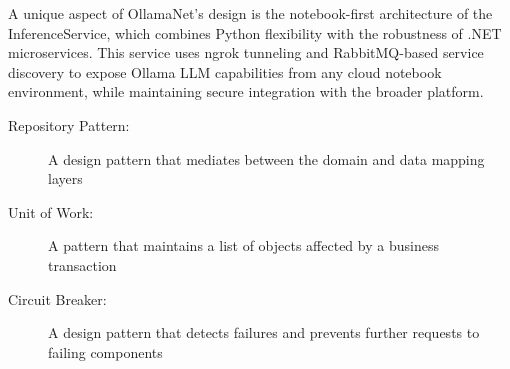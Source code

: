 A unique aspect of OllamaNet's design is the notebook-first architecture of the InferenceService, which combines Python flexibility with the robustness of .NET microservices. This service uses ngrok tunneling and RabbitMQ-based service discovery to expose Ollama LLM capabilities from any cloud notebook environment, while maintaining secure integration with the broader platform.

\begin{terminology}
\begin{description}
    \item[Repository Pattern:] A design pattern that mediates between the domain and data mapping layers
    \item[Unit of Work:] A pattern that maintains a list of objects affected by a business transaction
    \item[Circuit Breaker:] A design pattern that detects failures and prevents further requests to failing components
\end{description}
\end{terminology}






